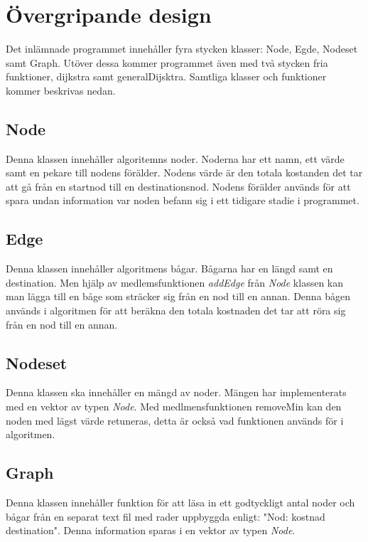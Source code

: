 \documentclass[12pt]{article}
\date {#1}
\title {
    \documentNumber {01}    

    \documentTitle {Dijkstras algoritm}
    
  
    
\author{Filip Sjövall - Oscar Blixt}



}
\begin{document}
\maketitle
\thispagestyle{empty}


\newpage

\section*{Övergripande design}

Det inlämnade programmet innehåller fyra stycken klasser: Node, Egde, Nodeset samt Graph. Utöver dessa kommer programmet även med två stycken fria funktioner, dijkstra samt generalDijsktra. Samtliga klasser och funktioner kommer beskrivas nedan.

\subsection*{Node}
Denna klassen innehåller algoritemns noder. Noderna har ett namn, ett värde samt en pekare till nodens förälder. Nodens värde är den totala kostanden det tar att gå från en startnod till en destinationsnod. Nodens förälder används för att spara undan information var noden befann sig i ett tidigare stadie i programmet. 


\subsection*{Edge}
Denna klassen innehåller algoritmens bågar. Bågarna har en längd samt en destination. Men hjälp av medlemsfunktionen \textit{addEdge} från \textit{Node} klassen kan man lägga till en båge som sträcker sig från en nod till en annan. Denna bågen används i algoritmen för att beräkna den totala kostnaden det tar att röra sig från en nod till en annan.

\subsection*{Nodeset}
Denna klassen ska innehåller en mängd av noder. Mängen har implementerats med en vektor av typen \textit{Node}. Med medlmensfunktionen removeMin kan den noden med lägst värde retuneras, detta är också vad funktionen används för i algoritmen.

\subsection*{Graph}
Denna klassen innehåller funktion för att läsa in ett godtyckligt antal noder och bågar från en separat text fil med rader uppbyggda enligt: "Nod: kostnad destination". Denna information sparas i en vektor av typen \textit{Node}.
\end{document}
